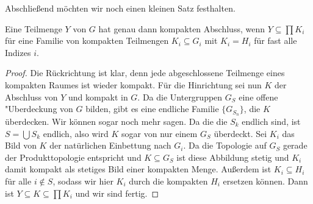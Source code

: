		Abschließend möchten wir noch einen kleinen Satz festhalten.
		\begin{satz}%
			Eine Teilmenge $Y$ von $G$ hat genau dann kompakten Abschluss, wenn $Y \subseteq \prod{K_i}$ für eine Familie von kompakten Teilmengen $K_i \subseteq G_i$ mit $K_i = H_i$ für fast alle Indizes $i$.
		\end{satz}
		\begin{proof}
			Die Rückrichtung ist klar, denn jede abgeschlossene Teilmenge eines kompakten Raumes ist wieder kompakt. 
			Für die Hinrichtung sei nun $K$ der Abschluss von $Y$ und kompakt in $G$. 
			Da die Untergruppen $G_S$ eine offene "Uberdeckung von $G$ bilden, gibt es eine endliche Familie $\{G_{S_n}\}$, die $K$ überdecken. 
			Wir können sogar noch mehr sagen. Da die die $S_k$ endlich sind, ist $S = \bigcup S_k$ endlich, also wird $K$ sogar von nur einem $G_S$ überdeckt. 
			Sei $K_i$ das Bild von $K$ der natürlichen Einbettung nach $G_i$. 
			Da die Topologie auf $G_S$ gerade der Produkttopologie entspricht und $K\subseteq G_S$ ist diese Abbildung stetig und $K_i$ damit kompakt als stetiges Bild einer kompakten Menge. Außerdem ist $K_i \subseteq H_i$ für alle $i\notin S$, sodass wir hier $K_i$ durch die kompakten $H_i$ ersetzen können. Dann ist $Y\subseteq K \subseteq \prod{K_i}$ und wir sind fertig.
		\end{proof}
 
